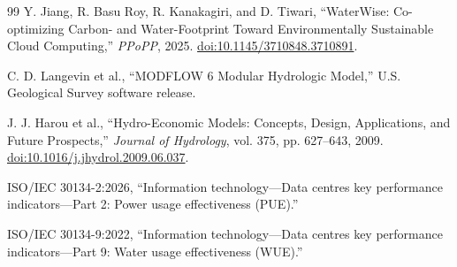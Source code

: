 \documentclass[11pt]{article}
\begin{document}
\begin{thebibliography}{99}
Y. Jiang, R. Basu Roy, R. Kanakagiri, and D. Tiwari,
``WaterWise: Co-optimizing Carbon- and Water-Footprint Toward Environmentally Sustainable Cloud Computing,''
\emph{PPoPP}, 2025.
\href{https://doi.org/10.1145/3710848.3710891}{doi:10.1145/3710848.3710891}.

C. D. Langevin et al.,
``MODFLOW 6 Modular Hydrologic Model,''
U.S. Geological Survey software release.

J. J. Harou et al.,
``Hydro-Economic Models: Concepts, Design, Applications, and Future Prospects,''
\emph{Journal of Hydrology}, vol. 375, pp. 627--643, 2009.
\href{https://doi.org/10.1016/j.jhydrol.2009.06.037}{doi:10.1016/j.jhydrol.2009.06.037}.

ISO/IEC 30134-2:2026,
``Information technology---Data centres key performance indicators---Part 2: Power usage effectiveness (PUE).''

ISO/IEC 30134-9:2022,
``Information technology---Data centres key performance indicators---Part 9: Water usage effectiveness (WUE).''

\end{thebibliography}
\end{document}
